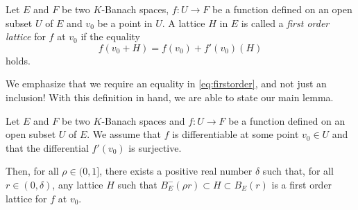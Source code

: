 \documentclass{lms}
\begin{document}
\begin{deftn}
\label{def:firstorder}
Let $E$ and $F$ be two $K$-Banach spaces, $f : U \rightarrow F$ be a 
function defined on an open subset $U$ of $E$ and $v_0$ be a 
point in $U$.
A lattice $H$ in $E$ is called a \emph{first order lattice} for $f$ at 
$v_0$ if the equality
\begin{equation}
\label{eq:firstorder}
f(v_0 + H) = f(v_0) + f'(v_0) (H)
\end{equation}
holds.
\end{deftn}

We emphasize that we require an equality in \eqref{eq:firstorder}, 
and not just an inclusion! 
With this definition in hand, we are able to state our main lemma.

\begin{lem} \label{lem:main}
Let $E$ and $F$ be two $K$-Banach spaces and $f : U 
\rightarrow F$ be a function defined on an open subset $U$ of $E$.
We assume that $f$ is differentiable at some point $v_0 \in 
U$ and that the differential $f'(v_0)$ is surjective. 

Then, for all $\rho \in (0, 1]$, there exists a positive real 
number $\delta$ such that, for all $r \in (0, \delta)$, any lattice
$H$ such that $B^-_E(\rho r) \subset H \subset B_E(r)$ is a first
order lattice for $f$ at $v_0$.
\end{lem}
\end{document}
